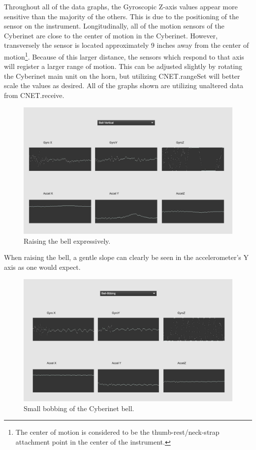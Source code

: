 Throughout all of the data graphs, the Gyroscopic Z-axis values appear more sensitive than the majority of the others. This is due to the positioning of the sensor on the instrument. Longitudinally, all of the motion sensors of the Cyberinet are close to the center of motion in the Cyberinet. However, transversely the sensor is located approximately 9 inches away from the center of motion\footnote{The center of motion is considered to be the thumb-rest/neck-strap attachment point in the center of the instrument.}. Because of this larger distance, the sensors which respond to that axis will register a larger range of motion. This can be adjusted slightly by rotating the Cyberinet main unit on the horn, but utilizing CNET.rangeSet will better scale the values as desired. All of the graphs shown are utilizing unaltered data from CNET.receive.

\begin{figure}
    \centering
    \includegraphics[scale=0.25]{diagrams/gestureData/bellVert.png}
    \caption{Raising the bell expressively.}
    \label{fig:bellRaiseData}
\end{figure}

When raising the bell, a gentle slope can clearly be seen in the accelerometer's Y axis as one would expect. 

\begin{figure}
    \centering
    \includegraphics[scale=0.25]{diagrams/gestureData/bellBob.png}
    \caption{Small bobbing of the Cyberinet bell.}
    \label{fig:bellBobData}
\end{figure}

